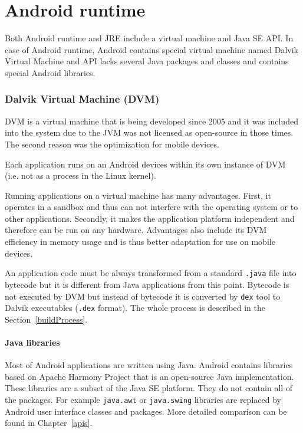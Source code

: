 \section{Android runtime}\label{AndroidRuntime}
Both Android runtime and JRE include a virtual machine and Java SE API. In case of Android runtime, Android contains special virtual machine named Dalvik Virtual Machine and API lacks several Java packages and classes and contains special Android libraries.

\subsubsection{Dalvik Virtual Machine (DVM)}
DVM is a virtual machine that is being developed since 2005 and it was included into the system due to the JVM was not licensed as open-source in those times. The second reason was the optimization for mobile devices. 

Each application runs on an Android devices within its own instance of DVM (i.e. not as a process in the Linux kernel).

Running applications on a virtual machine has many advantages. First, it operates in a sandbox and thus can not interfere with the operating system or to other applications. Secondly, it makes the application platform independent and therefore can be run on any hardware. Advantages also include its DVM efficiency in memory usage and is thus better adaptation for use on mobile devices.

An application code must be always transformed from a standard \texttt{.java} file into bytecode but it is different from Java applications from this point. Bytecode is not executed by DVM but instead of bytecode it is converted by \texttt{dex} tool to Dalvik executables (\texttt{.dex} format). The whole process is described in the Section~\ref{buildProcess}.


\paragraph{Java libraries}
Most of Android applications are written using Java. Android contains libraries based on Apache Harmony Project that is an open-source Java implementation. These libraries are a subset of the Java SE platform. They do not contain all of the packages. For example \texttt{java.awt} or \texttt{java.swing} libraries are replaced by Android user interface classes and packages. More detailed comparison can be found in Chapter~\ref{apis}.

